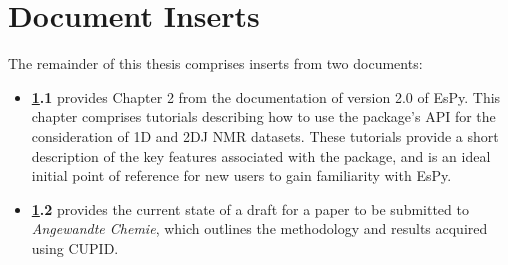 \chapter{Document Inserts}
\label{chap:inserts}
The remainder of this thesis comprises inserts from two documents:
\begin{itemize}
    \item \textbf{\ref{chap:inserts}.1} provides Chapter 2 from the
        documentation of version 2.0 of \acs{EsPy}. This chapter comprises
        tutorials describing how to use the
        package's \ac{API} for the consideration of \ac{1D} and \ac{2DJ}
        \ac{NMR} datasets. These tutorials provide a short description of the
        key features associated with the package, and is an ideal
        initial point of reference for new users to gain familiarity with
        \ac{EsPy}.
    \item \textbf{\ref{chap:inserts}.2} provides the current state of a draft
        for a paper to be submitted to \textit{Angewandte Chemie}, which
        outlines the methodology and results acquired using \ac{CUPID}.
\end{itemize}

{}
{}


{}
{}

\clearpage
{}
{}
\label{sec:cupid-draft}

